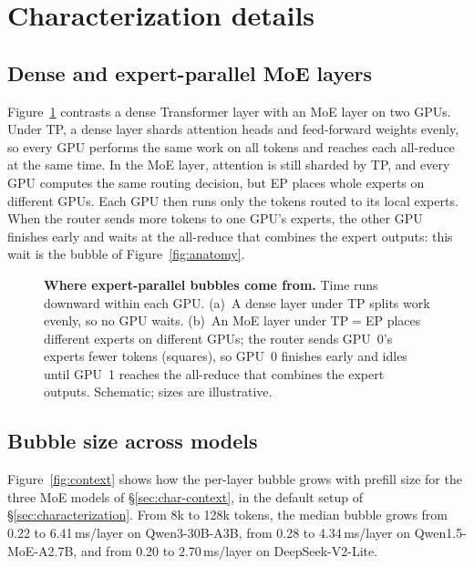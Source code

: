 \section{Characterization details}
\label{sec:appx-char}

\subsection{Dense and expert-parallel MoE layers}
\label{sec:appx-arch}

Figure~\ref{fig:appx-arch} contrasts a dense Transformer layer with an
\ac{MoE} layer on two GPUs. Under \ac{TP}, a dense layer shards
attention heads and feed-forward weights evenly, so every GPU performs
the same work on all tokens and reaches each all-reduce at the same
time. In the \ac{MoE} layer, attention is still sharded by \ac{TP}, and
every GPU computes the same routing decision, but \ac{EP} places whole
experts on different GPUs. Each GPU then runs only the tokens routed to
its local experts. When the router sends more tokens to one GPU's
experts, the other GPU finishes early and waits at the all-reduce that
combines the expert outputs: this wait is the bubble of
Figure~\ref{fig:anatomy}.

\begin{figure}[t]
  \centering
  \caption{\textbf{Where expert-parallel bubbles come from.} Time runs
    downward within each GPU. (a)~A dense layer under \ac{TP} splits
    work evenly, so no GPU waits. (b)~An \ac{MoE} layer under
    \ac{TP}$=$\ac{EP} places different experts on different GPUs; the
    router sends GPU~0's experts fewer tokens (squares), so GPU~0
    finishes early and idles until GPU~1 reaches the all-reduce that
    combines the expert outputs. Schematic; sizes are illustrative.}
  \label{fig:appx-arch}
\end{figure}

\subsection{Bubble size across models}
\label{sec:appx-context}

Figure~\ref{fig:context} shows how the per-layer bubble grows with
prefill size for the three \ac{MoE} models of \S\ref{sec:char-context},
in the default setup of \S\ref{sec:characterization}. From 8k to 128k
tokens, the median bubble grows from 0.22 to 6.41\,ms/layer on
Qwen3-30B-A3B, from 0.28 to 4.34\,ms/layer on Qwen1.5-MoE-A2.7B, and
from 0.20 to 2.70\,ms/layer on DeepSeek-V2-Lite.

